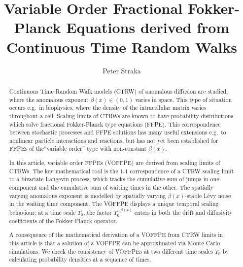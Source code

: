 \documentclass[a4paper,12pt]{elsarticle}
\numberwithin{equation}{section}
\theoremstyle{plain}
\theoremstyle{definition}
\theoremstyle{remark}
\numberwithin{equation}{section}
\newcommand{\1}{\mathbf 1}
\begin{document}
\begin{frontmatter}

\title{Variable Order Fractional Fokker-Planck Equations derived from 
Continuous Time Random Walks}
\author[UNSW]{Peter Straka}
\address[UNSW]{School of Mathematics \& Statistics, UNSW Sydney, Sydney NSW 2052, Australia}


\begin{abstract}
Continuous Time Random Walk models (CTRW) of anomalous diffusion are 
studied, 
where the anomalous exponent $\beta(x) \in (0,1)$ varies in space.  This 
type of situation occurs e.g.\ in biophysics, where the density of the 
intracellular matrix varies throughout a cell.  Scaling limits of CTRWs
are known to have probability distributions which solve fractional 
Fokker-Planck type equations (FFPE).  This correspondence between 
stochastic processes and FFPE solutions has many useful extensions e.g.\ 
to nonlinear particle interactions and reactions, but has not yet been
established for FFPEs of the``variable order'' type with non-constant 
$\beta(x)$. 

In this article, variable order FFPEs (VOFFPE) are derived from scaling 
limits of CTRWs.  The key mathematical tool is the 1-1 correspondence 
of a CTRW scaling limit to a bivariate Langevin process, which tracks the
cumulative sum of jumps in one component and the cumulative sum of waiting 
times in the other. The spatially varying anomalous exponent is
modelled by spatially varying $\beta(x)$-stable L\'evy noise in the 
waiting time component. 
The VOFFPE displays a unique temporal 
scaling behaviour: at a time scale $T_0$, the factor $T_0^{-\beta(x)}$ 
enters in both the drift and diffusivity coefficients of the Fokker-Planck 
operator.  

A consequence of the mathematical derivation of a VOFFPE from CTRW limits 
in this article is that a solution of a VOFFPE can be approximated via 
Monte Carlo simulations.  
We check the consistency of VOFFPEs at two different time scales $T_0$ by 
calculating probability densities at a sequence of times.

\end{abstract}





\end{frontmatter}
\end{document}

